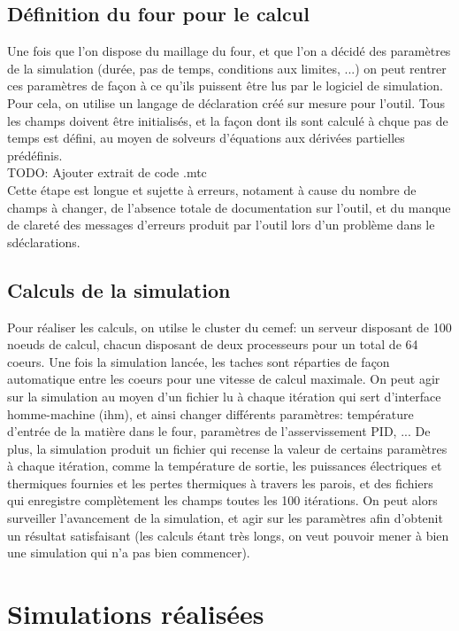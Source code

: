 \documentclass[12pt, a4paper, french, BCOR = 0pt, DIV = 10]{scrartcl}
\begin{document}
    \subsection{Définition du four pour le calcul}
    Une fois que l'on dispose du maillage du four, et que l'on a décidé des paramètres de la simulation (durée, pas de temps, conditions aux limites, ...) on peut rentrer ces paramètres de façon à ce qu'ils puissent être lus par le logiciel de simulation. Pour cela, on utilise un langage de déclaration créé sur mesure pour l'outil. Tous les champs doivent être initialisés, et la façon dont ils sont calculé à chque pas de temps est défini, au moyen de solveurs d'équations aux dérivées partielles prédéfinis.\\
    TODO: Ajouter extrait de code .mtc\\
    Cette étape est longue et sujette à erreurs, notament à cause du nombre de champs à changer, de l'absence totale de documentation sur l'outil, et du manque de clareté des messages d'erreurs produit par l'outil lors d'un problème dans le sdéclarations.

    \subsection{Calculs de la simulation}
    Pour réaliser les calculs, on utilse le cluster du cemef: un serveur disposant de 100 noeuds de calcul, chacun disposant de deux processeurs pour un total de 64 coeurs. Une fois la simulation lancée, les taches sont réparties de façon automatique entre les coeurs pour une vitesse de calcul maximale. On peut agir sur la simulation au moyen d'un fichier lu à chaque itération qui sert d'interface homme-machine (ihm), et ainsi changer différents paramètres: température d'entrée de la matière dans le four, paramètres de l'asservissement PID, ... De plus, la simulation produit un fichier qui recense la valeur de certains paramètres à chaque itération, comme la température de sortie, les puissances électriques et thermiques fournies et les pertes thermiques à travers les parois, et des fichiers qui enregistre complètement les champs toutes les 100 itérations. On peut alors surveiller l'avancement de la simulation, et agir sur les paramètres afin d'obtenit un résultat satisfaisant (les calculs étant très longs, on veut pouvoir mener à bien une simulation qui n'a pas bien commencer).

    
    \section{Simulations réalisées}
    
\end{document}
